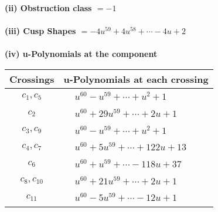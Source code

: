 \documentclass[1p]{elsarticle_modified}
\theoremstyle{definition}
\begin{document}
\flushleft \textbf{(ii) Obstruction class $= -1$}\\~\\
\flushleft \textbf{(iii) Cusp Shapes $= -4 u^{59}+4 u^{58}+\cdots-4 u+2$}\\~\\
\newpage\renewcommand{\arraystretch}{1}
\flushleft \textbf{(iv) u-Polynomials at the component}\newline \\
\begin{tabular}{m{50pt}|m{274pt}}
Crossings & \hspace{64pt}u-Polynomials at each crossing \\
\hline $$\begin{aligned}c_{1},c_{5}\end{aligned}$$&$\begin{aligned}
&u^{60}- u^{59}+\cdots+u^2+1
\end{aligned}$\\
\hline $$\begin{aligned}c_{2}\end{aligned}$$&$\begin{aligned}
&u^{60}+29 u^{59}+\cdots+2 u+1
\end{aligned}$\\
\hline $$\begin{aligned}c_{3},c_{9}\end{aligned}$$&$\begin{aligned}
&u^{60}- u^{59}+\cdots+u^2+1
\end{aligned}$\\
\hline $$\begin{aligned}c_{4},c_{7}\end{aligned}$$&$\begin{aligned}
&u^{60}+5 u^{59}+\cdots+122 u+13
\end{aligned}$\\
\hline $$\begin{aligned}c_{6}\end{aligned}$$&$\begin{aligned}
&u^{60}+u^{59}+\cdots-118 u+37
\end{aligned}$\\
\hline $$\begin{aligned}c_{8},c_{10}\end{aligned}$$&$\begin{aligned}
&u^{60}+21 u^{59}+\cdots+2 u+1
\end{aligned}$\\
\hline $$\begin{aligned}c_{11}\end{aligned}$$&$\begin{aligned}
&u^{60}-5 u^{59}+\cdots-12 u+1
\end{aligned}$\\
\hline
\end{tabular}\\~\\
\end{document}
